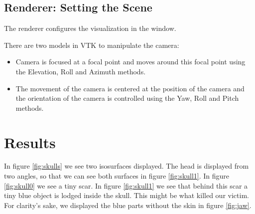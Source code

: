 \documentclass{article}
\begin{document}
\subsection{Renderer: Setting the Scene}
The renderer configures the visualization in the window. 

There are two models in VTK to manipulate the camera:
\begin{itemize}
\item Camera is focused at a focal point and moves around this focal point using the Elevation, Roll and Azimuth methods.
\item The movement of the camera is centered at the position of the camera and the orientation of the camera is controlled using the Yaw, Roll and Pitch methods.
\end{itemize}


\section{Results}

In figure \ref{fig:skulls} we see two isosurfaces displayed. The head is displayed
from two angles, so that we can see both surfaces in figure \ref{fig:skull1}.
In figure \ref{fig:skull0} we see a tiny scar.
In figure \ref{fig:skull1} we see that behind this scar a tiny blue object is
lodged inside the skull. This might be what killed our victim.
For clarity's sake, we displayed the blue parts without the skin in figure
\ref{fig:jaw}.
\end{document}
